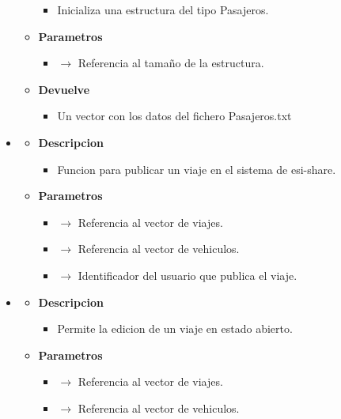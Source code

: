 \begin{itemize}
\begin{itemize}
\begin{itemize}
			\item Inicializa una estructura del tipo Pasajeros.
		\end{itemize}
		\item \textbf{Parametros}
		\begin{itemize}
			\item {} $\rightarrow$ Referencia al tamaño de la estructura.
		\end{itemize}
		\item \textbf{Devuelve}
		\begin{itemize}
			\item Un vector con los datos del fichero Pasajeros.txt
		\end{itemize}
	\end{itemize}
    \item {}
    \begin{itemize}
        \item \textbf{Descripcion}
        \begin{itemize}
			\item Funcion para publicar un viaje en el sistema de esi-share.
		\end{itemize}
		\item \textbf{Parametros}
		\begin{itemize}
			\item {}  $\rightarrow$ Referencia al vector de viajes.
            \item {} $\rightarrow$ Referencia al vector de vehiculos.
            \item {} $\rightarrow$ Identificador del usuario que publica el viaje.
		\end{itemize}
	\end{itemize}
    \item {}
    \begin{itemize}
        \item \textbf{Descripcion}
        \begin{itemize}
			\item  Permite la edicion de un viaje en estado abierto.
		\end{itemize}
		\item \textbf{Parametros}
		\begin{itemize}
			\item {}  $\rightarrow$ Referencia al vector de viajes.
            \item {} $\rightarrow$ Referencia al vector de vehiculos.

\end{itemize}
\end{itemize}
\end{itemize}
